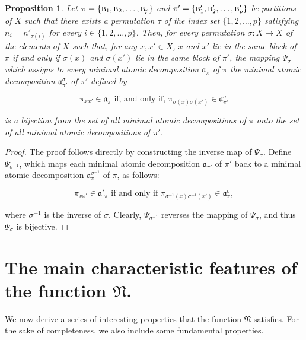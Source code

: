 \documentclass[12pt]{extarticle}
\newtheorem{Proposition}{Proposition}
\begin{document}
	\begin{Proposition}\label{permutations}
		Let $\pi=\{\textsc{b}_1, \textsc{b}_2,\ldots,\textsc{b}_p\}$ and $\pi'=\{\textsc{b}'_1, \textsc{b}'_2,\ldots,\textsc{b}'_p\}$ be partitions of $X$ such that there exists a permutation $\tau$ of the index set $\{1,2,\ldots,p\}$ satisfying $n_i=n'_{\tau(i)}$ for every $i\in\{1,2,\ldots,p\}$. Then, for every permutation $\sigma:X\rightarrow X$ of the elements of $X$ such that, for any $x,x'\in X$, $x$ and $x'$ lie in the same block of $\pi$ if and only if $\sigma(x)$ and $\sigma(x')$ lie in the same block of $\pi'$,  the mapping $\Psi_{\sigma}$ which assigns to every minimal atomic decomposition $\mathfrak{a}_{\pi}$ of $\pi$  the minimal atomic decomposition $\mathfrak{a}^{\sigma}_{\pi'}$ of $\pi'$ defined by
		
		$$\pi_{xx'}\in \mathfrak{a}_{\pi} \text{ if, and only if, } \pi_{\sigma(x)\sigma(x')}\in \mathfrak{a}^{\sigma}_{\pi'}$$
		
		is a bijection from the set of all minimal atomic decompositions of $\pi$ onto the set of all minimal atomic decompositions of $\pi'$.
	\end{Proposition}
	\begin{proof}  The proof follows directly by constructing the inverse map of $\Psi_{\sigma}$. Define $\Psi_{\sigma^{-1}}$, which maps each minimal atomic decomposition $\mathfrak{a}_{\pi'}$ of $\pi'$ back to a minimal atomic decomposition $\mathfrak{a}^{\sigma^{-1}}_{\pi}$ of $\pi$, as follows:
		
		$$\pi_{xx'}\in \mathfrak{a}'_{\pi} \text{ if and only if } \pi_{\sigma^{-1}(x)\sigma^{-1}(x')}\in \mathfrak{a}^{\sigma}_{\pi},$$
		
		where $\sigma^{-1}$ is the inverse of $\sigma$. Clearly, $\Psi_{\sigma^{-1}}$ reverses the mapping of $\Psi_{\sigma}$, and thus $\Psi_{\sigma}$ is bijective.  
		
	\end{proof}
	
	
	\section{The main characteristic features of the function $\mathfrak{N}$. }\label{PropertiesOfN}
	
	We now derive a series of interesting properties that the function $\mathfrak{N}$ satisfies. For the sake of completeness, we also include some fundamental properties.  
	
\end{document}
